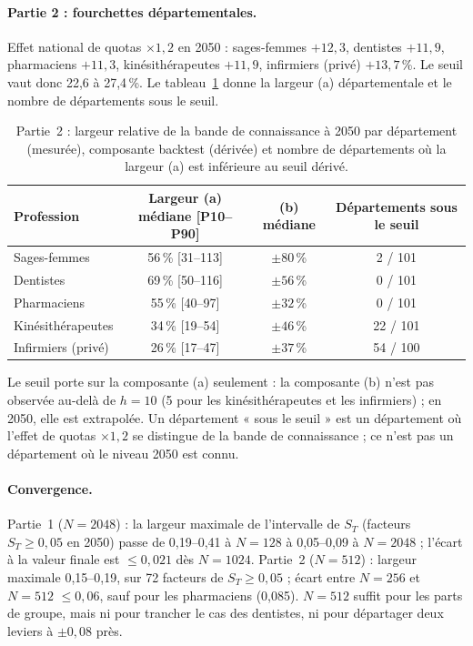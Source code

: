 \paragraph{Partie 2 : fourchettes départementales.} Effet national de quotas $\times 1{,}2$ en 2050 : sages-femmes
$+12{,}3$, dentistes $+11{,}9$, pharmaciens $+11{,}3$, kinésithérapeutes $+11{,}9$, infirmiers (privé)
$+13{,}7$\mesure{}\,\%. Le seuil vaut donc 22,6 à 27,4\derive{}\,\%. Le tableau~\ref{sen:tab:dep} donne la largeur
(a) départementale et le nombre de départements sous le seuil.

\begin{table}[h]
\centering\small
\begin{tabular}{lccc}
\toprule
Profession & Largeur (a) médiane [P10--P90] & (b) médiane & Départements sous le seuil \\
\midrule
Sages-femmes & 56\,\% [31--113] & $\pm 80$\,\% & 2 / 101 \\
Dentistes & 69\,\% [50--116] & $\pm 56$\,\% & 0 / 101 \\
Pharmaciens & 55\,\% [40--97] & $\pm 32$\,\% & 0 / 101 \\
Kinésithérapeutes & 34\,\% [19--54] & $\pm 46$\,\% & 22 / 101 \\
Infirmiers (privé) & 26\,\% [17--47] & $\pm 37$\,\% & 54 / 100 \\
\bottomrule
\end{tabular}
\caption{Partie~2 : largeur relative de la bande de connaissance à 2050 par département (mesurée\mesure{}), composante
backtest (dérivée\derive{}) et nombre de départements où la largeur (a) est inférieure au seuil dérivé.}
\label{sen:tab:dep}
\end{table}

Le seuil porte sur la composante (a) seulement : la composante (b) n'est pas observée au-delà de $h = 10$ (5 pour
les kinésithérapeutes et les infirmiers) ; en 2050, elle est extrapolée. Un département « sous le seuil » est un
département où l'effet de quotas $\times 1{,}2$ se distingue de la bande de connaissance ; ce
n'est pas un département où le niveau 2050 est connu.

\paragraph{Convergence.} Partie~1 ($N = 2048$) : la largeur maximale de l'intervalle de $S_T$ (facteurs
$S_T \ge 0{,}05$ en 2050) passe de 0,19--0,41 à $N = 128$ à 0,05--0,09\mesure{} à $N = 2048$ ; l'écart à la valeur
finale est $\le 0{,}021$\mesure{} dès $N = 1024$. Partie~2 ($N = 512$) : largeur maximale 0,15--0,19\mesure{}, sur
72 facteurs de $S_T \ge 0{,}05$ ; écart entre $N = 256$ et $N = 512$ $\le 0{,}06$\mesure{}, sauf pour les pharmaciens
(0,085\mesure{}). $N = 512$ suffit pour les parts de groupe, mais ni pour trancher le cas des dentistes, ni pour
départager deux leviers à $\pm 0{,}08$ près.

